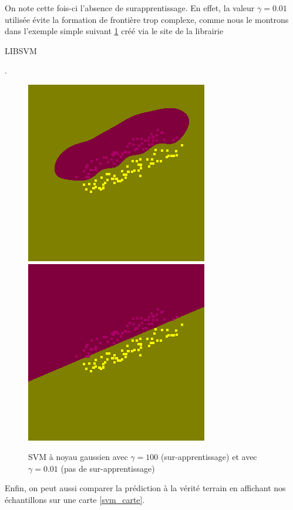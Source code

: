 \documentclass{book}
\begin{document}
On note cette fois-ci l'absence de surapprentissage. En effet, la valeur $\gamma=0.01$ utilisée évite la formation de frontière trop complexe, comme nous le montrons dans l'exemple simple
suivant \ref{svm_exemple} créé via le site de la librairie \begin{itshape}LIBSVM\end{itshape}\cite{libsvm}.\\

\begin{figure}[H]
 \begin{center}
\includegraphics[scale=0.5]{images/svm/svm_g_100.png}
\includegraphics[scale=0.5]{images/svm/svm_g_001.png}
 \caption{SVM à noyau gaussien avec $\gamma=100$ (sur-apprentissage) et avec $\gamma=0.01$ (pas de sur-apprentissage)}
 \label{svm_exemple}
 \end{center}
\end{figure}

Enfin, on peut aussi comparer la prédiction à la vérité terrain en affichant nos échantillons sur une carte \ref{svm_carte}.
\end{document}
